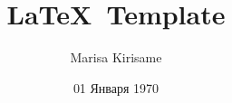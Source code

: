 \documentclass[a4paper]{article}
\title{\LaTeX\ Template}
\author{Marisa Kirisame}
\date{01 Января 1970}
\begin{document}
\maketitle
\blindtext
\end{document}
